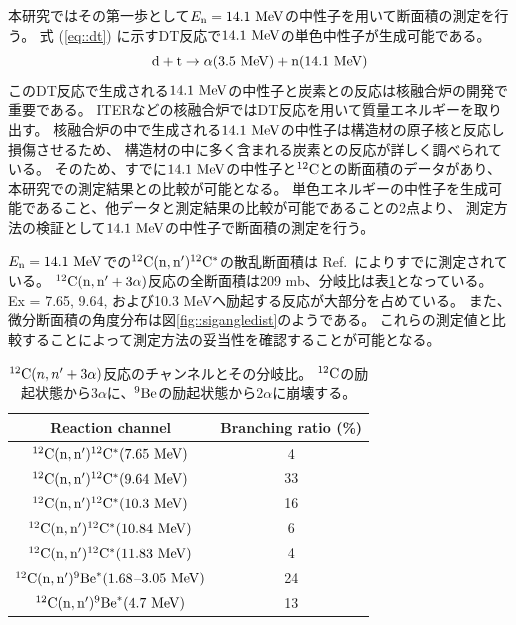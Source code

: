 本研究ではその第一歩として$E_{\rm n} = 14.1~{\rm MeV}$の中性子を用いて断面積の測定を行う。
式 (\ref{eq::dt}) に示すDT反応で$14.1~{\rm MeV}$の単色中性子が生成可能である。
\begin{equation}
  {\rm d} + {\rm t} \rightarrow \alpha (3.5~{\rm MeV}) + {\rm n} (14.1~{\rm MeV})
  \label{eq::dt}
\end{equation}
このDT反応で生成される$14.1~{\rm MeV}$の中性子と炭素との反応は核融合炉の開発で重要である。
ITERなどの核融合炉ではDT反応を用いて質量エネルギーを取り出す。
核融合炉の中で生成される$14.1~{\rm MeV}$の中性子は構造材の原子核と反応し損傷させるため、
構造材の中に多く含まれる炭素との反応が詳しく調べられている。
そのため、すでに$14.1~{\rm MeV}$の中性子と${}^{12}{\rm C}$との断面積のデータがあり、本研究での測定結果との比較が可能となる。
単色エネルギーの中性子を生成可能であること、他データと測定結果の比較が可能であることの2点より、
測定方法の検証として$14.1~{\rm MeV}$の中性子で断面積の測定を行う。

$E_{\rm n}=14.1~{\rm MeV}$での${}^{12}{\rm C}({\rm n},{\rm n}'){}^{12}{\rm C}^{*}$の散乱断面積は
Ref.~\cite{takahashietal,kondoetal}によりすでに測定されている。
${}^{12}{\rm C}({\rm n},{\rm n}'+3\alpha)$反応の全断面積は209 mb、分岐比は表\ref{tab::branchingratio}となっている。
Ex = 7.65, 9.64, および10.3 MeVへ励起する反応が大部分を占めている。
また、微分断面積の角度分布は図\ref{fig::sigangledist}のようである。
これらの測定値と比較することによって測定方法の妥当性を確認することが可能となる。

\begin{table}
  \centering
  \caption[${}^{12}{\rm C}(n,n'+3\alpha)$反応のチャンネルとその分岐比。]
          {${}^{12}{\rm C}(n,n'+3\alpha)$反応のチャンネルとその分岐比。
  ${}^{12}{\rm C}$の励起状態から$3\alpha$に、${}^{9}{\rm Be}$の励起状態から$2\alpha$に崩壊する。}
  \label{tab::branchingratio}
  \begin{tabular}{cc}
    \toprule
    Reaction channel & Branching ratio (\%)\\
    \midrule
    ${}^{12}{\rm C}({\rm n},{\rm n}'){}^{12}{\rm C}^{*}(7.65~{\rm MeV})$ & 4\\
    ${}^{12}{\rm C}({\rm n},{\rm n}'){}^{12}{\rm C}^{*}(9.64~{\rm MeV})$ & 33\\
    ${}^{12}{\rm C}({\rm n},{\rm n}'){}^{12}{\rm C}^{*}(10.3~{\rm MeV})$ & 16\\
    ${}^{12}{\rm C}({\rm n},{\rm n}'){}^{12}{\rm C}^{*}(10.84~{\rm MeV})$ & 6\\
    ${}^{12}{\rm C}({\rm n},{\rm n}'){}^{12}{\rm C}^{*}(11.83~{\rm MeV})$ & 4\\
    ${}^{12}{\rm C}({\rm n},{\rm n}'){}^{9}{\rm Be}^{*}(1.68$--$3.05~{\rm MeV})$ & 24\\
    ${}^{12}{\rm C}({\rm n},{\rm n}'){}^{9}{\rm Be}^{*}(4.7~{\rm MeV})$ & 13\\
    \bottomrule
  \end{tabular}
\end{table}

